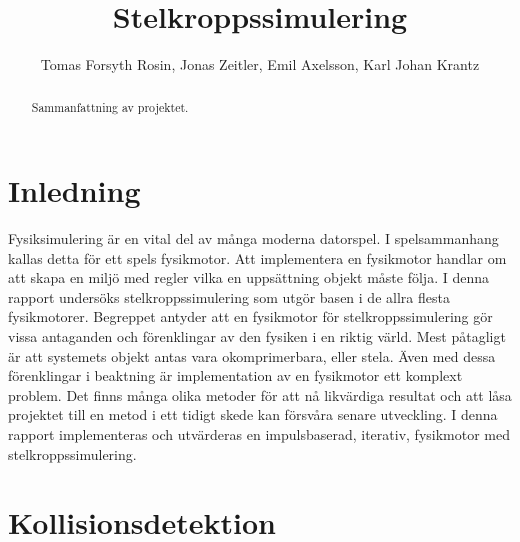 \documentclass[a4paper,12pt,twocolumn,swedish]{article}
\begin{document}
\title{Stelkroppssimulering}
\author{Tomas Forsyth Rosin, Jonas Zeitler, Emil Axelsson, Karl Johan Krantz}
\begin{titlepage}
\maketitle
\thispagestyle{empty}
\end{titlepage}
\setcounter{page}{1}
\begin{abstract}
Sammanfattning av projektet.
\end{abstract}
\clearpage
\onecolumn
\tableofcontents
\twocolumn
\clearpage
\listoffigures
\clearpage
\listoftables
\clearpage
\setcounter{page}{1}

\section{Inledning}

Fysiksimulering  är en vital del av många moderna datorspel. I spelsammanhang kallas detta för ett spels fysikmotor. Att implementera en fysikmotor handlar om att skapa en miljö med regler vilka en uppsättning objekt måste följa. I denna rapport undersöks stelkroppssimulering som utgör basen i de allra flesta fysikmotorer. Begreppet antyder att en fysikmotor för stelkroppssimulering gör vissa antaganden och förenklingar av den fysiken i en riktig värld. Mest påtagligt är att systemets objekt antas vara okomprimerbara, eller stela. Även med dessa förenklingar i beaktning är implementation av en fysikmotor ett komplext problem. Det finns många olika metoder för att nå likvärdiga resultat och att låsa projektet till en metod i ett tidigt skede kan försvåra senare utveckling. I denna rapport implementeras och utvärderas en impulsbaserad, iterativ, fysikmotor med stelkroppssimulering.
\section{Kollisionsdetektion}
\end{document}
